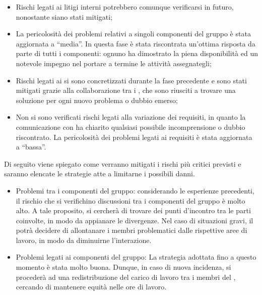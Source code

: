 \FloatBarrier
\begin{itemize}
\item Rischi legati ai litigi interni potrebbero comunque verificarsi in futuro, nonostante siano stati mitigati;
\item La pericolosità dei problemi relativi a singoli componenti del gruppo è stata aggiornata a ``media''. In questa fase è stata riscontrata un'ottima risposta da parte di tutti i componenti: ognuno ha dimostrato la piena disponibilità ed un notevole impegno nel portare a termine le attività assegnategli;
\item Rischi legati ai  si sono concretizzati durante la fase precedente e sono stati mitigati grazie alla collaborazione tra i \rPs, che sono riusciti a trovare una soluzione per ogni nuovo problema o dubbio emerso;
\item Non si sono verificati rischi legati alla variazione dei requisiti, in quanto la comunicazione con \proponente ha chiarito qualsiasi possibile incomprensione o dubbio riscontrato. La pericolosità dei problemi legati ai requisiti è stata aggiornata a ``bassa''.
\end{itemize}
\label{mRisk5}
Di seguito viene spiegato come verranno mitigati i rischi più critici previsti e saranno elencate le strategie atte a limitarne i possibili danni.
\begin{itemize}
\item{Problemi tra i componenti del gruppo:} considerando le esperienze precedenti, il rischio che si verifichino discussioni tra i componenti del gruppo è molto alto. A tale proposito, si cercherà di trovare dei punti d'incontro tra le parti coinvolte, in modo da appianare le divergenze. Nel caso di situazioni gravi, il \rRP potrà decidere di allontanare i membri problematici dalle rispettive aree di lavoro, in modo da diminuirne l'interazione.
\item{Problemi legati ai componenti del gruppo:} La strategia adottata fino a questo momento è stata molto buona. Dunque, in caso di nuova incidenza, si procederà ad una redistribuzione del carico di lavoro tra i membri del , cercando di mantenere equità nelle ore di lavoro.
\end{itemize}
